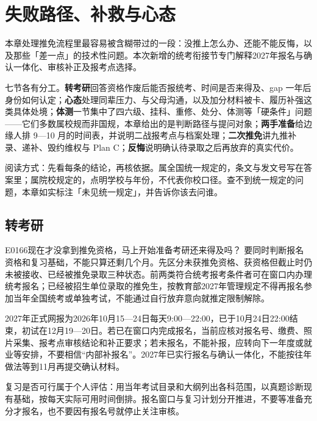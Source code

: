 \chapter{失败路径、补救与心态}
\label{ch12}
\begin{keybox}
本章处理推免流程里最容易被含糊带过的一段：没推上怎么办、还能不能反悔，以及那些「差一点」的技术性问题。本次新增的统考衔接节专门解释2027年报名与确认一体化、审核补正及报考点选择。

七节各有分工。\textbf{转考研}回答资格作废后能否报统考、时间是否来得及、gap 一年后身份如何认定；\textbf{心态}处理同辈压力、与父母沟通，以及加分材料被卡、履历补强这类具体处境；\textbf{体测}一节集中了四六级、挂科、重修、处分、体测等「硬条件」问题——它们多数属校规而非国规，本章给出的是判断路径与提问对象；\textbf{两手准备}给边缘人排 9—10 月的时间表，并说明二战报考点与档案处理；\textbf{二次推免}讲九推补录、递补、毁约维权与 Plan C；\textbf{反悔}说明确认待录取之后再放弃的真实代价。

阅读方式：先看每条的结论，再核依据。属全国统一规定的，条文与发文号写在答案里；属院校规定的，点明学校与年份，不代表你校口径。查不到统一规定的问题，本章如实标注「未见统一规定」，并告诉你该去问谁。
\end{keybox}

\section{转考研}
\begin{qa}{E0166}{现在才没拿到推免资格，马上开始准备考研还来得及吗？}
要同时判断报名资格和复习基础，不能只算还剩几个月。先区分未获推免资格、获资格但截止时仍未被接收、已经被推免录取三种状态。前两类符合统考报考条件者可在窗口内办理统考报名；已经被招生单位录取的推免生，按教育部2027年管理规定不得再报名参加当年全国统考或单独考试，不能通过自行放弃意向就推定限制解除。

2027年正式网报为2026年10月15—24日每天9:00—22:00，已于10月24日22:00结束，初试在12月19—20日。若已在窗口内完成报名，当前应核对报名号、缴费、照片采集、报考点审核结论和补正要求；若未报名，不能补报，应转向下一年度或就业等安排，不要相信“内部补报名”。2027年已实行报名与确认一体化，不能按往年做法等到11月再提交确认材料。 

复习是否可行属于个人评估：用当年考试目录和大纲列出各科范围，以真题诊断现有基础，按每天实际可用时间倒排。报名窗口与复习计划分开推进，不要等准备充分才报名，也不要因有报名号就停止关注审核。
\end{qa}

